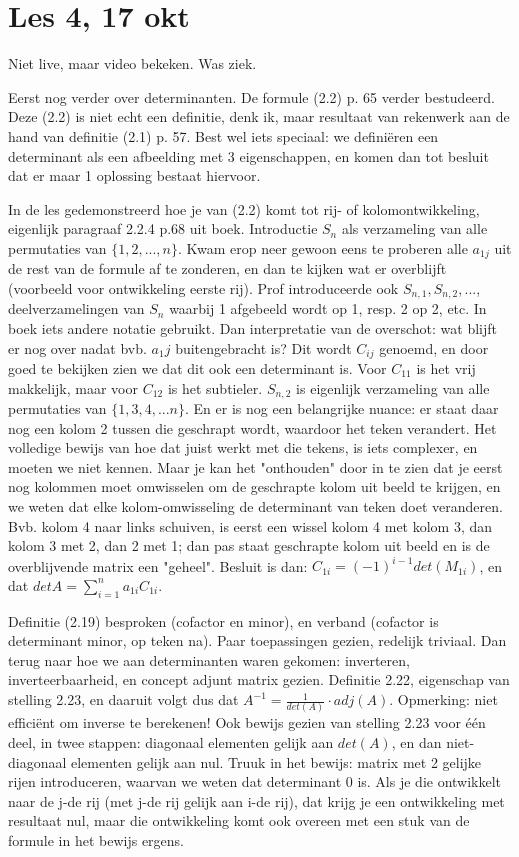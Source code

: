 \documentclass{article}
\begin{document}
\section{Les 4, 17 okt}
Niet live, maar video bekeken. Was ziek. 

Eerst nog verder over determinanten. De formule (2.2) p. 65 verder bestudeerd. Deze (2.2) is niet echt een definitie, denk ik, maar resultaat van rekenwerk aan de hand van definitie (2.1) p. 57. Best wel iets speciaal: we defini\"eren een determinant als een afbeelding met 3 eigenschappen, en komen dan tot besluit dat er maar 1 oplossing bestaat hiervoor. 

In de les gedemonstreerd hoe je van (2.2) komt tot rij- of kolomontwikkeling, eigenlijk paragraaf 2.2.4 p.68 uit boek. Introductie $S_n$ als verzameling van alle permutaties van $\{1,2,...,n\}$. Kwam erop neer gewoon eens te proberen alle $a_{1j}$ uit de rest van de formule af te zonderen, en dan te kijken wat er overblijft (voorbeeld voor ontwikkeling eerste rij). Prof introduceerde ook $S_{n,1}, S_{n,2},...$, deelverzamelingen van $S_n$ waarbij 1 afgebeeld wordt op 1, resp. 2 op 2, etc. In boek iets andere notatie gebruikt. Dan interpretatie van de overschot: wat blijft er nog over nadat bvb. $a_1j$ buitengebracht is? Dit wordt $C_{ij}$ genoemd, en door goed te bekijken zien we dat dit ook een determinant is. Voor $C_{11}$ is het vrij makkelijk, maar voor $C_{12}$ is het subtieler. $S_{n,2}$ is eigenlijk verzameling van alle permutaties van $\{1,3,4,...n\}$. En er is nog een belangrijke nuance: er staat daar nog een kolom 2 tussen die geschrapt wordt, waardoor het teken verandert. Het volledige bewijs van hoe dat juist werkt met die tekens, is iets complexer, en moeten we niet kennen. Maar je kan het "onthouden" door in te zien dat je eerst nog kolommen moet omwisselen om de geschrapte kolom uit beeld te krijgen, en we weten dat elke kolom-omwisseling de determinant van teken doet veranderen. Bvb. kolom 4 naar links schuiven, is eerst een wissel kolom 4 met kolom 3, dan kolom 3 met 2, dan 2 met 1; dan pas staat geschrapte kolom uit beeld en is de overblijvende matrix een "geheel". 
Besluit is dan: $C_{1i} = (-1)^{i-1} det (M_{1i})$, en dat $det A=  \sum_{i=1}^{n} a_{1i}C_{1i}$. 

Definitie (2.19) besproken (cofactor en minor), en verband (cofactor is determinant minor, op teken na). Paar toepassingen gezien, redelijk triviaal. Dan terug naar hoe we aan determinanten waren gekomen: inverteren, inverteerbaarheid, en concept adjunt matrix gezien. Definitie 2.22, eigenschap van stelling 2.23, en daaruit volgt dus dat $A^{-1}= \frac{1}{det(A)} \cdot adj(A)$. Opmerking: niet effici\"ent om inverse te berekenen! Ook bewijs gezien van stelling 2.23 voor \'e\'en deel, in twee stappen: diagonaal elementen gelijk aan $det(A)$, en dan niet-diagonaal elementen gelijk aan nul. Truuk in het bewijs: matrix met 2 gelijke rijen introduceren, waarvan we weten dat determinant 0 is. Als je die ontwikkelt naar de j-de rij (met j-de rij gelijk aan i-de rij), dat krijg je een ontwikkeling met resultaat nul, maar die ontwikkeling komt ook overeen met een stuk van de formule in het bewijs ergens. 
\end{document}
